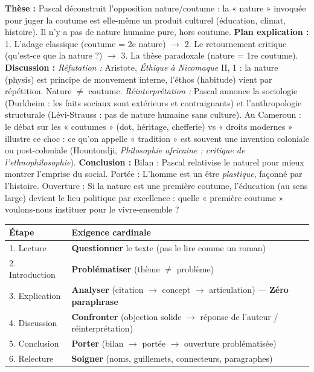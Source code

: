 \documentclass[11pt]{article}
\begin{document}
\begin{corrige}
\textbf{Thèse :} Pascal déconstruit l'opposition nature/coutume : la « nature » invoquée pour juger la coutume est elle-même un produit culturel (éducation, climat, histoire). Il n'y a pas de nature humaine pure, hors coutume.
\textbf{Plan explication :} 1. L'adage classique (coutume = 2e nature) $\rightarrow$ 2. Le retournement critique (qu'est-ce que la nature ?) $\rightarrow$ 3. La thèse paradoxale (nature = 1re coutume).
\textbf{Discussion :} \textit{Réfutation :} Aristote, \emph{Éthique à Nicomaque} II, 1 : la nature (physis) est principe de mouvement interne, l'éthos (habitude) vient par répétition. Nature $\neq$ coutume. \textit{Réinterprétation :} Pascal annonce la sociologie (Durkheim : les faits sociaux sont extérieurs et contraignants) et l'anthropologie structurale (Lévi-Strauss : pas de nature humaine sans culture). Au Cameroun : le débat sur les « coutumes » (dot, héritage, chefferie) vs « droits modernes » illustre ce choc : ce qu'on appelle « tradition » est souvent une invention coloniale ou post-coloniale (Hountondji, \emph{Philosophie africaine : critique de l'ethnophilosophie}).
\textbf{Conclusion :} Bilan : Pascal relativise le naturel pour mieux montrer l'emprise du social. Portée : L'homme est un être \emph{plastique}, façonné par l'histoire. Ouverture : Si la nature est une première coutume, l'éducation (au sens large) devient le lieu politique par excellence : quelle « première coutume » voulons-nous instituer pour le vivre-ensemble ?
\end{corrige}

\begin{aretenir}
\begin{center}
\begin{tabularx}{\linewidth}{|l|X|}\hline
\rowcolor{popblueL}
\textbf{Étape} & \textbf{Exigence cardinale} \\\hline
1. Lecture & \textbf{Questionner} le texte (pas le lire comme un roman) \\\hline
2. Introduction & \textbf{Problématiser} (thème $\neq$ problème) \\\hline
3. Explication & \textbf{Analyser} (citation $\rightarrow$ concept $\rightarrow$ articulation) — \textbf{Zéro paraphrase} \\\hline
4. Discussion & \textbf{Confronter} (objection solide $\rightarrow$ réponse de l'auteur / réinterprétation) \\\hline
5. Conclusion & \textbf{Porter} (bilan $\rightarrow$ portée $\rightarrow$ ouverture problématisée) \\\hline
6. Relecture & \textbf{Soigner} (noms, guillemets, connecteurs, paragraphes) \\\hline
\end{tabularx}
\end{center}
\end{aretenir}
\end{document}
